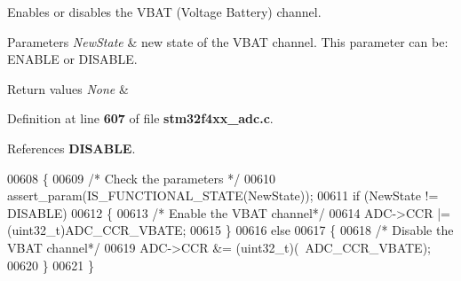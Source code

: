Enables or disables the V\+B\+AT (Voltage Battery) channel. 


\begin{DoxyParams}{Parameters}
{\em New\+State} & new state of the V\+B\+AT channel. This parameter can be\+: E\+N\+A\+B\+LE or D\+I\+S\+A\+B\+LE. \\
\hline
\end{DoxyParams}

\begin{DoxyRetVals}{Return values}
{\em None} & \\
\hline
\end{DoxyRetVals}


Definition at line \textbf{ 607} of file \textbf{ stm32f4xx\+\_\+adc.\+c}.



References \textbf{ D\+I\+S\+A\+B\+LE}.


\begin{DoxyCode}
00608 \{
00609   \textcolor{comment}{/* Check the parameters */}
00610   assert_param(IS_FUNCTIONAL_STATE(NewState));
00611   \textcolor{keywordflow}{if} (NewState != DISABLE)
00612   \{
00613     \textcolor{comment}{/* Enable the VBAT channel*/}
00614     ADC->CCR |= (uint32\_t)ADC_CCR_VBATE;
00615   \}
00616   \textcolor{keywordflow}{else}
00617   \{
00618     \textcolor{comment}{/* Disable the VBAT channel*/}
00619     ADC->CCR &= (uint32\_t)(~ADC_CCR_VBATE);
00620   \}
00621 \}
\end{DoxyCode}

